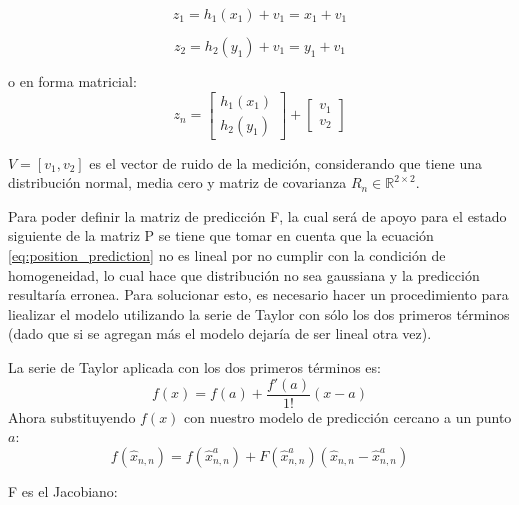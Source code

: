 \begin{equation}
z_1 = h_1(x_1) + v_1 = x_1 + v_1 
\label{eq:x_entry}
\end{equation}

\begin{equation}
z_2 = h_2(y_1) + v_1 = y_1 + v_1 
\label{eq:y_entry}
\end{equation}

o en forma matricial:
\begin{equation}
z_n =
\begin{bmatrix}
h_1(x_1) \\ 
h_2(y_1)
\end{bmatrix}
+
\begin{bmatrix}
v_1 \\ 
v_2
\end{bmatrix}
\end{equation}

$V = [v_1, v_2]$ es el vector de ruido de la medición, considerando que tiene una distribución normal, media cero y matriz de covarianza $R_n\in\mathbb{R}^{2\times 2}$.

Para poder definir la matriz de predicción F, la cual será de apoyo para el estado siguiente de la matriz P se tiene que tomar en cuenta que la ecuación \ref{eq:position_prediction} no es lineal por no cumplir con la condición de homogeneidad, lo cual hace que distribución no sea gaussiana y la predicción resultaría erronea. Para solucionar esto, es necesario hacer un procedimiento para liealizar el modelo utilizando la serie de Taylor con sólo los dos primeros términos (dado que si se agregan más el modelo dejaría de ser lineal otra vez).
	
La serie de Taylor aplicada con los dos primeros términos es:
\begin{equation}
	f(x) = f(a) + \frac{f'(a)}{1!} (x-a)
\end{equation} 
Ahora substituyendo $f(x)$ con nuestro modelo de predicción cercano a un punto $a$:
\begin{equation}
	f(\hat{x}_{n,n}) = f(\hat{x}^a_{n,n}) + F(\hat{x}^a_{n,n})(\hat{x}_{n,n} - \hat{x}^a_{n,n})
\end{equation}

F es el Jacobiano:

